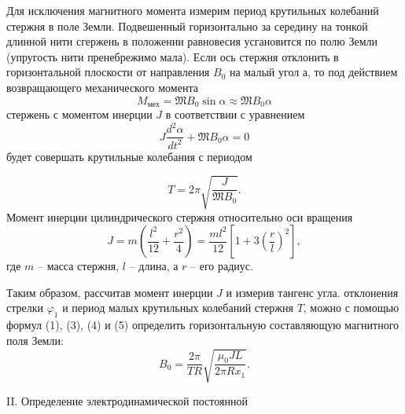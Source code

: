 \documentclass[a4paper,12pt]{article} %
\renewcommand{\phi}{\ensuremath{\varphi}} %
\theoremstyle{plain} %
\theoremstyle{definition} %
\theoremstyle{remark} %
\renewcommand{\phi}{\ensuremath{\varphi}}
\begin{document}
Для исключения магнитного момента измерим период крутильных
колебаний стержня в поле Земли. Подвешенный горизонтально за середину на тонкой длинной нити сгержень в положении равновесия усгановится по полю Земли (упругость нити пренебрежимо мала). Если ось
стержня отклонить в горизонтальной плоскости от направления $B_0$ на
малый угол а, то под действием возвращающего механического момента
\[ M_{\text{мех}} = \mathfrak{M} B_0 \sin\alpha \approx \mathfrak{M} B_0 \alpha\]
стержень с моментом инерции $J$ в соответствии с уравнением
\[ J \dfrac{d^2 \alpha}{dt^2} + \mathfrak{M} B_0 \alpha =0   \]
будет совершать крутильные колебания с периодом

\begin{equation}
T=2\pi \sqrt{\dfrac{J}{\mathfrak{M}B_0}}.
\end{equation}
Момент инерции цилиндрического стержня относительно оси вращения
\begin{equation}
J=m\left(\dfrac{l^2}{12}+\dfrac{r^2}{4}\right)=\dfrac{ml^2}{12}\left[1+3\left(\dfrac{r}{l}\right)^2\right],
\end{equation}
где $m$ -- масса стержня, $l$ -- длина, а $r$ -- его радиус.


Таким образом, рассчитав момент инерции $J$ и измерив тангенс угла.
отклонения стрелки $\phi_1$ и период малых крутильных колебаний стержня $T$, можно с помощью формул (1), (3), (4) и (5) определить горизонтальную составляющую магнитного поля Земли:
\begin{equation}
B_0=\dfrac{2\pi}{TR}\sqrt{\dfrac{\mu_0 J L }{2\pi R x_1}}.
\end{equation}


\textsf{II. Определение электродинамической постоянной}
\end{document}
